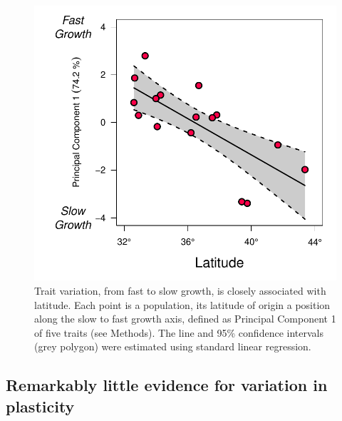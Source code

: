 \documentclass[11pt, oneside]{article}\usepackage[]{graphicx}\usepackage[]{color}
\begin{document}
\begin{figure}[h!]
	\centerline{\includegraphics[width=1\textwidth]{Figures/Figure_PC1vLat.pdf}}
	\fontsize{10}{12}
	\selectfont
	\caption[Southern populations grow faster]{Trait variation, from fast to slow growth, is closely associated with latitude. Each point is a population, its latitude of origin a position along the slow to fast growth axis, defined as Principal Component 1 of five traits (see Methods). The line and 95\% confidence intervals (grey polygon) were estimated using standard linear regression.}
	\label{fig:Fig_PC1vLat}
\end{figure}

\subsection*{Remarkably little evidence for variation in plasticity}
\end{document}
